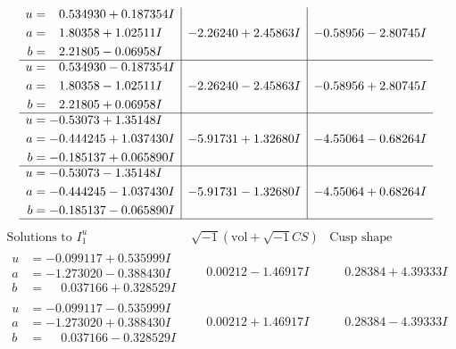 \documentclass[1p]{elsarticle_modified}
\theoremstyle{definition}
\newcommand{\I}{\sqrt{-1}}
\begin{document}
$$\begin{array}{c|c|c}
\begin{aligned}
u &= \phantom{-}0.534930 + 0.187354 I \\
a &= \phantom{-}1.80358 + 1.02511 I \\
b &= \phantom{-}2.21805 - 0.06958 I\end{aligned}
 & -2.26240 + 2.45863 I & -0.58956 - 2.80745 I \\ \hline\begin{aligned}
u &= \phantom{-}0.534930 - 0.187354 I \\
a &= \phantom{-}1.80358 - 1.02511 I \\
b &= \phantom{-}2.21805 + 0.06958 I\end{aligned}
 & -2.26240 - 2.45863 I & -0.58956 + 2.80745 I \\ \hline\begin{aligned}
u &= -0.53073 + 1.35148 I \\
a &= -0.444245 + 1.037430 I \\
b &= -0.185137 + 0.065890 I\end{aligned}
 & -5.91731 + 1.32680 I & -4.55064 - 0.68264 I \\ \hline\begin{aligned}
u &= -0.53073 - 1.35148 I \\
a &= -0.444245 - 1.037430 I \\
b &= -0.185137 - 0.065890 I\end{aligned}
 & -5.91731 - 1.32680 I & -4.55064 + 0.68264 I\\
 \hline 
 \end{array}$$\newpage$$\begin{array}{c|c|c}  
\text{Solutions to }I^u_{1}& \I (\text{vol} + \sqrt{-1}CS) & \text{Cusp shape}\\
 \hline 
\begin{aligned}
u &= -0.099117 + 0.535999 I \\
a &= -1.273020 - 0.388430 I \\
b &= \phantom{-}0.037166 + 0.328529 I\end{aligned}
 & \phantom{-}0.00212 - 1.46917 I & \phantom{-}0.28384 + 4.39333 I \\ \hline\begin{aligned}
u &= -0.099117 - 0.535999 I \\
a &= -1.273020 + 0.388430 I \\
b &= \phantom{-}0.037166 - 0.328529 I\end{aligned}
 & \phantom{-}0.00212 + 1.46917 I & \phantom{-}0.28384 - 4.39333 I \\ \hline\begin{aligned}

\end{aligned}
\end{array}$$
\end{document}
